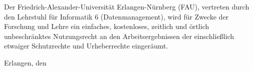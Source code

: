 \vspace{2cm}

\noindent
Der Friedrich-Alexander-Universität Erlangen-Nürnberg (FAU), vertreten durch
den Lehrstuhl für Informatik 6 (Datenmanagement), wird für Zwecke der
Forschung und Lehre ein einfaches, kostenloses, zeitlich und örtlich
unbeschränktes Nutzungsrecht an den Arbeitsergebnissen der \thethesis{}
einschließlich etwaiger Schutzrechte und Urheberrechte eingeräumt.

\vspace{2cm}
Erlangen, den \dayofdoom{}

\vspace{2cm}
\myname{} \hfill \ 

\vspace{0,5cm}
%
\cleardoubleemptypage
%
\pagestyle{plain}
%
\setcounter{page}{7}
%

%
\cleardoubleplainpage
%
\tableofcontents
%
\cleardoubleplainpage
%
\listoffigures
%
\cleardoubleplainpage
%
\listoftables
%
\cleardoubleplainpage
%
\lstlistoflistings
%
\cleardoubleplainpage
%
\pagestyle{headings}
%
%
\setcounter{page}{1}
